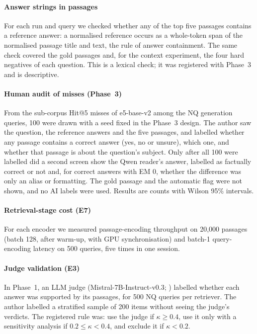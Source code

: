 \paragraph{Answer strings in passages} For each run and query we checked whether any of the top five passages contains a reference answer: a normalised reference occurs as a whole-token span of the normalised passage title and text, the rule of answer containment. The same check covered the gold passages and, for the context experiment, the four hard negatives of each question. This is a lexical check; it was registered with Phase~3 and is descriptive.
\paragraph{Human audit of misses (Phase~3)} From the sub-corpus Hit@5 misses of e5-base-v2 among the NQ generation queries, 100 were drawn with a seed fixed in the Phase~3 design. The author saw the question, the reference answers and the five passages, and labelled whether any passage contains a correct answer (yes, no or unsure), which one, and whether that passage is about the question's subject. Only after all 100 were labelled did a second screen show the Qwen reader's answer, labelled as factually correct or not and, for correct answers with EM 0, whether the difference was only an alias or formatting. The gold passage and the automatic flag were not shown, and no AI labels were used. Results are counts with Wilson 95\% intervals.
\paragraph{Retrieval-stage cost (E7)} For each encoder we measured passage-encoding throughput on 20,000 passages (batch 128, after warm-up, with GPU synchronisation) and batch-1 query-encoding latency on 500 queries, five times in one session.
\paragraph{Judge validation (E3)} In Phase~1, an LLM judge (Mistral-7B-Instruct-v0.3; \citealp{jiang2023mistral}) labelled whether each answer was supported by its passages, for 500 NQ queries per retriever. The author labelled a stratified sample of 200 items without seeing the judge's verdicts. The registered rule was: use the judge if $\kappa\ge0.4$, use it only with a sensitivity analysis if $0.2\le\kappa<0.4$, and exclude it if $\kappa<0.2$.
